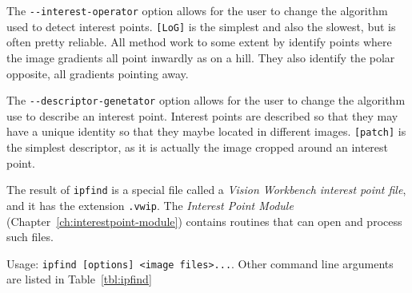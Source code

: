 The \verb#--interest-operator# option allows for the user to change the algorithm used to detect interest points. \verb#[LoG]# is the simplest and also the slowest, but is often pretty reliable. All method work to some extent by identify points where the image gradients all point inwardly as on a hill. They also identify the polar opposite, all gradients pointing away.

The \verb#--descriptor-genetator# option allows for the user to change the algorithm use to describe an interest point. Interest points are described so that they may have a unique identity so that they maybe located in different images. \verb#[patch]# is the simplest descriptor, as it is actually the image cropped around an interest point. 

The result of \verb#ipfind# is a special file called a \emph{Vision Workbench interest point file}, and it has the extension \verb#.vwip#. The \emph{Interest Point Module} (Chapter~\ref{ch:interestpoint-module}) contains routines that can open and process such files.

Usage: \verb#ipfind [options] <image files>...#. Other command line arguments are listed in Table~\ref{tbl:ipfind}

